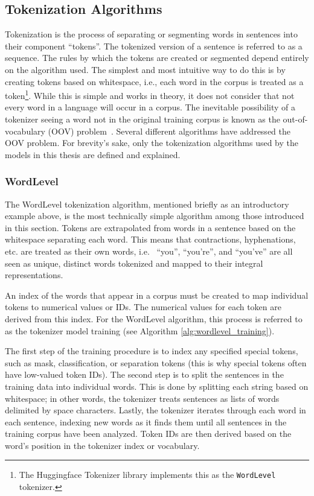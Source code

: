 \documentclass[12pt]{article}
\begin{document}
\subsection{Tokenization Algorithms}\label{sec:tokenizers}
Tokenization is the process of separating or segmenting words in sentences into their component ``tokens''. The tokenized version of a sentence is
referred to as a sequence. The rules by which the tokens are created or segmented depend entirely on the algorithm used. The simplest and most
intuitive way to do this is by creating tokens based on whitespace, i.e., each word in the corpus is treated as a token\footnote{The Huggingface
    Tokenizer library implements this as the \lstinline|WordLevel| tokenizer.}. While this is simple and works in theory, it does not consider that
not every word in a language will occur in a corpus. The inevitable possibility of a tokenizer seeing a word not in the original training corpus is
known as the out-of-vocabulary (OOV) problem~\cite{wu_googles_2016}. Several different algorithms have addressed the OOV problem. For brevity's sake,
only the tokenization algorithms used by the models in this thesis are defined and explained.

\subsubsection{WordLevel}\label{sec:wordlevel}
The WordLevel \cite{wolf_transformers_2020} tokenization algorithm, mentioned briefly as an introductory example above, is the most technically simple
algorithm among those introduced in this section. Tokens are extrapolated from words in a sentence based on the whitespace separating each word. This
means that contractions, hyphenations, etc. are treated as their own words, i.e.~ ``you'', ``you're'', and ``you've'' are all seen as unique, distinct
words tokenized and mapped to their integral representations.

An index of the words that appear in a corpus must be created to map individual tokens to numerical values or IDs. The numerical values for each token
are derived from this index. For the WordLevel algorithm, this process is referred to as the tokenizer model training (see Algorithm
\ref{alg:wordlevel_training}).

The first step of the training procedure is to index any specified special tokens, such as mask, classification, or separation tokens (this is why
special tokens often have low-valued token IDs). The second step is to split the sentences in the training data into individual words. This is done by
splitting each string based on whitespace; in other words, the tokenizer treats sentences as lists of words delimited by space characters. Lastly, the
tokenizer iterates through each word in each sentence, indexing new words as it finds them until all sentences in the training corpus have been
analyzed. Token IDs are then derived based on the word's position in the tokenizer index or vocabulary.
\end{document}
